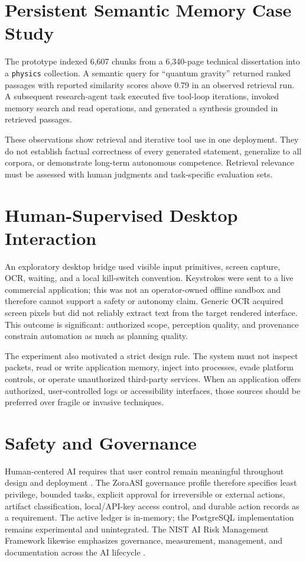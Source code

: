 \documentclass[11pt]{article}
\begin{document}
\section{Persistent Semantic Memory Case Study}
The prototype indexed 6,607 chunks from a 6,340-page technical dissertation into a \texttt{physics} collection. A semantic query for ``quantum gravity'' returned ranked passages with reported similarity scores above 0.79 in an observed retrieval run. A subsequent research-agent task executed five tool-loop iterations, invoked memory search and read operations, and generated a synthesis grounded in retrieved passages.

These observations show retrieval and iterative tool use in one deployment. They do not establish factual correctness of every generated statement, generalize to all corpora, or demonstrate long-term autonomous competence. Retrieval relevance must be assessed with human judgments and task-specific evaluation sets.

\section{Human-Supervised Desktop Interaction}
An exploratory desktop bridge used visible input primitives, screen capture, OCR, waiting, and a local kill-switch convention. Keystrokes were sent to a live commercial application; this was not an operator-owned offline sandbox and therefore cannot support a safety or autonomy claim. Generic OCR acquired screen pixels but did not reliably extract text from the target rendered interface. This outcome is significant: authorized scope, perception quality, and provenance constrain automation as much as planning quality.

The experiment also motivated a strict design rule. The system must not inspect packets, read or write application memory, inject into processes, evade platform controls, or operate unauthorized third-party services. When an application offers authorized, user-controlled logs or accessibility interfaces, those sources should be preferred over fragile or invasive techniques.

\section{Safety and Governance}
Human-centered AI requires that user control remain meaningful throughout design and deployment \citep{shneiderman2020human}. The ZoraASI governance profile therefore specifies least privilege, bounded tasks, explicit approval for irreversible or external actions, artifact classification, local/API-key access control, and durable action records as a requirement. The active ledger is in-memory; the PostgreSQL implementation remains experimental and unintegrated. The NIST AI Risk Management Framework likewise emphasizes governance, measurement, management, and documentation across the AI lifecycle \citep{nist2023airmf}.
\end{document}
